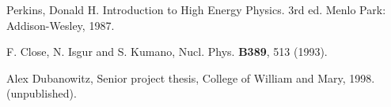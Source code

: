 \documentclass[12pt]{report}
\begin{document}
\begin{flushleft}

\begin{thebibliography}{99.}


 Perkins, Donald H.  Introduction to High Energy
Physics.  3rd ed.  Menlo Park: Addison-Wesley, 1987.

 F. Close, N. Isgur and S. Kumano,
Nucl. Phys. {\bf B389}, 513 (1993).

 Alex Dubanowitz, Senior project thesis, College of
William and Mary, 1998. (unpublished).

\end{thebibliography}
\end{flushleft}
\end{document}
